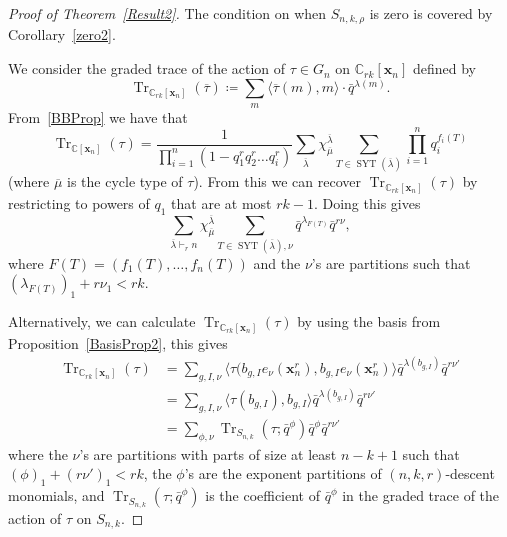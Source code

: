 \documentclass[ALCO,ThmDefs,Unicode,epreuves]{cedram}
\DeclareMathOperator{\SYT}{SYT}
\DeclareMathOperator{\Tr}{Tr}
\begin{document}
	\begin{proof}[Proof of Theorem~\ref{Result2}]
		The condition on when $S_{n,k,\rho}$ is zero is covered by Corollary~\ref{zero2}.

		 We consider the graded trace of the action of $\tau\in G_n$ on $\mathbb{C}_{rk}[\mathbf{x}_n]$ defined 
by
\begin{equation}
\Tr _{\mathbb{C}_{rk}[\mathbf{x}_n]}(\overline{\tau})\coloneqq \sum_m \langle \overline{\tau}(m),m\rangle 
\cdot \bar{q}^{\lambda(m)}.
\end{equation}
 From~\ref{BBProp} we have 
that
\begin{equation}
\Tr _{\mathbb{C}[\mathbf{x}_n]}(\tau)=\frac{1}{\prod_{i=1}^n(1-q_1^rq_2^r\ldots 
q_i^r)}\sum_{\overline{\lambda}}\chi_{\overline{\mu}}^{\overline{\lambda}}\sum_{T\in 
\SYT (\overline{\lambda})}\prod_{i=1}^{n} q_i^{f_i(T)}
\end{equation}
 (where $\overline{\mu}$ is the cycle type of $\tau$).
From this we can recover $\Tr _{\mathbb{C}_{rk}[\mathbf{x}_n]}(\tau)$ by restricting to powers of $q_1$ that are at most $rk-1$. 
Doing this gives
\begin{equation}
\sum_{\overline{\lambda}\vdash_r n}\chi_{\overline{\mu}}^{\overline{\lambda}}\sum_{T\in 
\SYT (\overline{\lambda}),\nu}\bar{q}^{\lambda_{F(T)}}\bar{q}^{r\nu},
\end{equation}
 where $F(T)=(f_1(T),\ldots, f_n(T))$ and the 
$\nu$'s are partitions such that $(\lambda_{F(T)})_1+r\nu_1<rk$.

		Alternatively, we can calculate $\Tr _{\mathbb{C}_{rk}[\mathbf{x}_n]}(\tau)$ by using the basis from Proposition~\ref{BasisProp2}, this gives
\begin{align}\Tr _{\mathbb{C}_{rk}[\mathbf{x}_n]}(\tau)&=\sum_{g,I,\nu} \langle \tau(b_{g,I} e_\nu(\mathbf{x}_n^r),b_{g,I} 
e_\nu(\mathbf{x}_n^r) \rangle \bar{q}^{\lambda(b_{g,I})}\bar{q}^{r\nu'}\\
&=\sum_{g,I,\nu} \langle \tau(b_{g,I}),b_{g,I} \rangle \bar{q}^{\lambda(b_{g,I})}\bar{q}^{r\nu'}\\
&=\sum_{\phi,\nu} \Tr _{S_{n,k}}(\tau; \bar{q}^\phi)\bar{q}^{\phi}\bar{q}^{r\nu'}\end{align}
where the $\nu$'s are partitions with parts of size at least $n-k+1$ such that $(\phi)_1+(r\nu')_1<rk$, the $\phi$'s are the 
exponent partitions of $(n,k,r)$-descent monomials, and $\Tr _{S_{n,k}}(\tau;\bar{q}^\phi)$ is the coefficient of $\bar{q}^\phi$ 
in the graded trace of the action of $\tau$ on $S_{n,k}$.


\end{proof}
\end{document}
